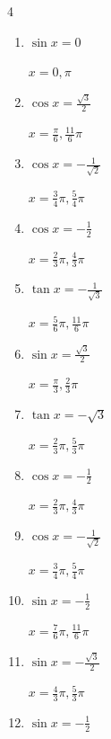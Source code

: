 \begin{multicols}{4}
\begin{enumerate}
  \item $\displaystyle \sin{x}  = 0$

        $\displaystyle x = 0 , \pi$

  \item $\displaystyle \cos{x}  = \frac{\sqrt{3}}{2}$

        $\displaystyle x = \frac{\pi}{6} , \frac{11}{6}\pi$

  \item $\displaystyle \cos{x}  = -\frac{1}{\sqrt{2}}$

        $\displaystyle x = \frac{3}{4}\pi , \frac{5}{4}\pi$

  \item $\displaystyle \cos{x}  = -\frac{1}{2}$

        $\displaystyle x = \frac{2}{3}\pi , \frac{4}{3}\pi$

  \item $\displaystyle \tan{x}  = -\frac{1}{\sqrt{3}}$

        $\displaystyle x = \frac{5}{6}\pi , \frac{11}{6}\pi$

  \item $\displaystyle \sin{x}  = \frac{\sqrt{3}}{2}$

        $\displaystyle x = \frac{\pi}{3} , \frac{2}{3}\pi$

  \item $\displaystyle \tan{x}  = -\sqrt{3}$

        $\displaystyle x = \frac{2}{3}\pi , \frac{5}{3}\pi$

  \item $\displaystyle \cos{x}  = -\frac{1}{2}$

        $\displaystyle x = \frac{2}{3}\pi , \frac{4}{3}\pi$

  \item $\displaystyle \cos{x}  = -\frac{1}{\sqrt{2}}$

        $\displaystyle x = \frac{3}{4}\pi , \frac{5}{4}\pi$

  \item $\displaystyle \sin{x}  = -\frac{1}{2}$

        $\displaystyle x = \frac{7}{6}\pi , \frac{11}{6}\pi$

  \item $\displaystyle \sin{x}  = -\frac{\sqrt{3}}{2}$

        $\displaystyle x = \frac{4}{3}\pi , \frac{5}{3}\pi$

  \item $\displaystyle \sin{x}  = -\frac{1}{2}$


\end{enumerate}
\end{multicols}
